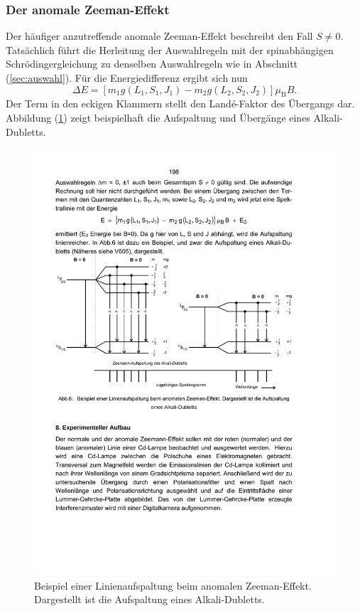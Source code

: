 \subsubsection{Der anomale Zeeman-Effekt}
Der häufiger anzutreffende anomale Zeeman-Effekt beschreibt den Fall $S\neq0$.
Tatsächlich führt die Herleitung der Auswahlregeln mit der spinabhängigen
Schrödingergleichung zu denselben Auswahlregeln wie in Abschnitt (\ref{sec:auswahl}).
Für die Energiedifferenz ergibt sich nun
\begin{equation}
    \Delta E=\left[m_1g(L_1,S_1,J_1)-m_2g(L_2,S_2,J_2)\right]\mu_{\mathup{B}}B.
    \label{eqn:dE_ano}
\end{equation}
Der Term in den eckigen Klammern stellt den Landé-Faktor des Übergangs dar.
Abbildung (\ref{fig:zeeman_anomal}) zeigt beispielhaft die Aufspaltung und
Übergänge eines Alkali-Dubletts.
\begin{figure}
    \centering
    \includegraphics[width=\textwidth]{graphics/zeeman_anomal.pdf}
    \caption{Beispiel einer Linienaufspaltung beim anomalen Zeeman-Effekt.
    Dargestellt ist die Aufspaltung eines Alkali-Dubletts.}
    \label{fig:zeeman_anomal}
\end{figure}

